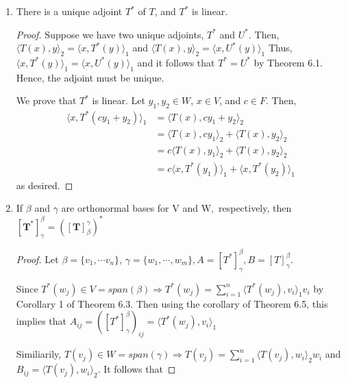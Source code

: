 \documentclass[11pt]{scrartcl}
\begin{document}
\begin{enumerate}[label=\alph*.]
	\item {
	      There is a unique adjoint $T^*$ of $T$, and $T^*$ is linear.
	      \begin{proof}
		      Suppose we have two unique adjoints, $T^*$ and $U^*$. Then,
		      $\langle T(x), y \rangle_2 = \langle x, T^*(y) \rangle_1$
		      and
		      $\langle T(x), y \rangle_2 = \langle x, U^*(y) \rangle_1$
		      Thus, $\langle x, T^*(y) \rangle_1 = \langle x, U^*(y) \rangle_1$ and it follows that $T^*=U^*$ by Theorem 6.1.
		      Hence, the adjoint must be unique. \par
		      We prove that $T^*$ is linear. Let $y_1, y_2 \in W$, $x \in V$, and $c \in F$. Then,
		      \begin{align*}
			      \langle x, T^*(cy_1 + y_2) \rangle_1 & = \langle T(x),  cy_1 + y_2 \rangle_2                             \\
			                                           & = \langle T(x),  cy_1 \rangle_2  + \langle T(x),  y_2 \rangle_2   \\
			                                           & = c \langle T(x),  y_1 \rangle_2  + \langle T(x),  y_2 \rangle_2  \\
			                                           & = c \langle x, T^*(y_1) \rangle_1 + \langle x, T^*(y_2) \rangle_1
		      \end{align*}
		      as desired.
	      \end{proof}
	      }
	\item{
	      If $\beta$ and $\gamma$ are orthonormal bases for $\mathrm{V}$ and $\mathrm{W},$ respectively,
	      then $\left[\mathbf{T}^{*}\right]_{\gamma}^{\beta}=\left([\mathbf{T}]_{\beta}^{\gamma}\right)^{*}$
	      \begin{proof}
		      Let $\beta = \{v_1, \cdots v_n\}$, $\gamma = \{w_1, \cdots, w_m\},
			      A = [T^*]_{\gamma}^{\beta}, B = [T]_{\gamma}^{\beta}$.\par
		      Since $T^*(w_j) \in V = span(\beta) \Rightarrow T^*(w_j) = \sum_{i = 1}^{n} \langle T^*(w_j), v_i \rangle_1 v_i$
		      by Corollary 1 of Theorem 6.3. Then using the corollary of Theorem 6.5,
		      this implies that $A_{ij} = ([T^*]_{\gamma}^{\beta})_{ij} = \langle T^*(w_j), v_i \rangle_1 $\par
		      Similiarily, $T(v_j) \in W = span(\gamma) \Rightarrow T(v_j) = \sum_{i = 1}^{n} \langle T(v_j), w_i \rangle_2 w_i$
		      and $B_{ij} = \langle T(v_j), w_i \rangle_2$. It follows that

\end{proof}}
\end{enumerate}
\end{document}
